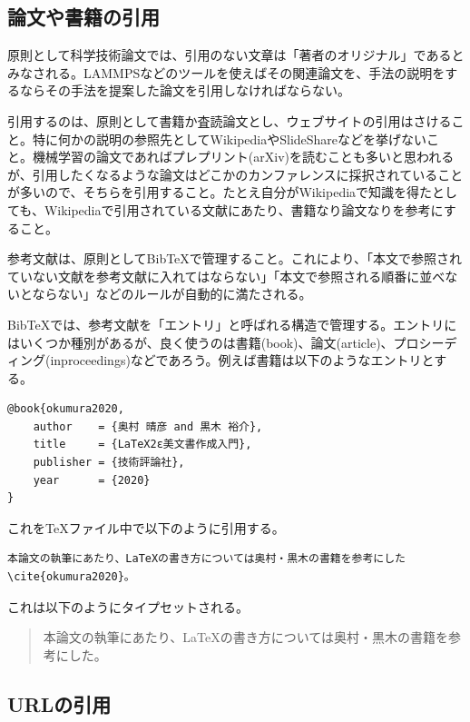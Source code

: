 \documentclass[titlepage]{jsreport}
\begin{document}
\subsection{論文や書籍の引用}

原則として科学技術論文では、引用のない文章は「著者のオリジナル」であるとみなされる。LAMMPSなどのツールを使えばその関連論文を、手法の説明をするならその手法を提案した論文を引用しなければならない。

引用するのは、原則として書籍か査読論文とし、ウェブサイトの引用はさけること。特に何かの説明の参照先としてWikipediaやSlideShareなどを挙げないこと。機械学習の論文であればプレプリント(arXiv)を読むことも多いと思われるが、引用したくなるような論文はどこかのカンファレンスに採択されていることが多いので、そちらを引用すること。たとえ自分がWikipediaで知識を得たとしても、Wikipediaで引用されている文献にあたり、書籍なり論文なりを参考にすること。

参考文献は、原則としてBibTeXで管理すること。これにより、「本文で参照されていない文献を参考文献に入れてはならない」「本文で参照される順番に並べないとならない」などのルールが自動的に満たされる。

BibTeXでは、参考文献を「エントリ」と呼ばれる構造で管理する。エントリにはいくつか種別があるが、良く使うのは書籍(book)、論文(article)、プロシーディング(inproceedings)などであろう。例えば書籍は以下のようなエントリとする。

\begin{lstlisting}[language={[LaTeX]TeX}]
@book{okumura2020,
    author    = {奥村 晴彦 and 黒木 裕介},
    title     = {LaTeX2ε美文書作成入門},
    publisher = {技術評論社},
    year      = {2020}
}
\end{lstlisting}

これをTeXファイル中で以下のように引用する。

\begin{verbatim}
本論文の執筆にあたり、LaTeXの書き方については奥村・黒木の書籍を参考にした\cite{okumura2020}。
\end{verbatim}

これは以下のようにタイプセットされる。
\begin{quotation}
    本論文の執筆にあたり、LaTeXの書き方については奥村・黒木の書籍を参考にした\cite{okumura2020}。
\end{quotation}

\subsection{URLの引用}
\end{document}
